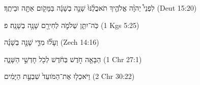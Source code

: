 
\begin{exe}

\ex\label{regrec_distrmix_exs1}
\texthebrew{
לִפְנֵי֩ יְהוָ֨ה אֱלֹהֶ֤יךָ תֹאכֲלֶ֨נּוּ֙ שָׁנָ֣ה בְשָׁנָ֔ה בַּמָּקֹ֖ום אַתָּ֖ה וּבֵיתֶֽךָ׃ 
} (Deut 15:20)

\ex\label{regrec_distrmix_exs2}
\texthebrew{
כֹּֽה־יִתֵּ֧ן שְׁלֹמֹ֛ה לְחִירָ֖ם שָׁנָ֥ה בְשָׁנָֽה׃ פ 
} (1 Kgs 5:25)

\ex\label{regrec_distrmix_exs3}
\texthebrew{
וְעָל֞וּ מִדֵּ֧י שָׁנָ֣ה בְשָׁנָ֗ה 
} (Zech 14:16)

\ex\label{regrec_distrmix_exs4}
\texthebrew{
הַבָּאָ֤ה חֹ֣דֶשׁ בְּחֹ֔דֶשׁ לְכֹ֖ל חָדְשֵׁ֣י הַשָּׁנָ֑ה 
} (1 Chr 27:1)

\ex\label{regrec_distrmix_exs5}
\texthebrew{
וַיֹּאכְל֤וּ אֶת־הַמֹּועֵד֙ שִׁבְעַ֣ת הַיָּמִ֔ים 
} (2 Chr 30:22)

\end{exe}

